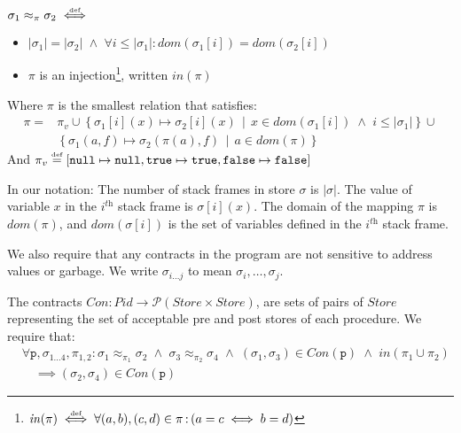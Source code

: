 \documentclass[runningheads,a4paper]{llncs}
\DeclareMathOperator{\band}{\bm{\;\land\;}}
\DeclareMathOperator{\suchthat}{:}
\newcommand*{\qvars}[2]{#1_{#2}}
\newcommand*{\powerset}[1]{\mathcal{P}(#1)}
\newcommand*{\domain}[1]{\mathit{dom}(#1)}
\newcommand*{\cardinality}[1]{\left|{#1}\right|}
\newcommand*{\defeq}{\stackrel{\text{\tiny def}}{=}}
\newcommand*{\defiff}{\stackrel{\text{\tiny def}}{\iff}}
\newcommand*{\setcomp}[2]{\left\{#1\,\middle|\,#2\right\}}
\newcommand*{\Store}{\mathit{Store}}
\newcommand*{\nullv}{\texttt{null}}
\newcommand*{\truev}{\texttt{true}}
\newcommand*{\falsev}{\texttt{false}}
\newcommand*{\Contract}{\mathit{Con}}
\newcommand*\iso{\approx}
\newcommand*{\PName}{\mathit{Pid}}
\newcommand*{\fun}{\texttt{p}}
\newcommand*{\bijection}[1]{\mathit{in}{\left(#1\right)}}
\newcommand*{\store}{\sigma}
\begin{document}
\newcommand*{\piv}{\pi_v}
\begin{definition}[Isomorphism]\label{def:global isomorphism}\setlength{\parindent}{0cm}~

	$\store_1\iso_\pi\store_2 \defiff$
	\begin{itemize}
		\item $\cardinality{\store_1} = \cardinality{\store_2} \band \forall i \le \cardinality{\store_1} \suchthat\domain{\store_1[i]} = \domain{\store_2[i]}$
		\item $\pi$ is an injection\footnote{$\bijection{\pi} \defiff \forall (a,b), (c,d) \in \pi \suchthat \left(a=c \iff b=d\right)$}, written $\bijection{\pi}$
	\end{itemize}

	Where $\pi$ is the smallest relation that satisfies:
		\[\begin{aligned}
		   \pi = &\piv \cup
		   \setcomp{\store_1[i](x)\mapsto\store_2[i](x)}{x \in \domain{\store_1[i]} \band i \le \cardinality{\store_1}} \cup \\
		   &\setcomp{\store_1(a,f)\mapsto\store_2(\pi(a),f)}{a \in \domain{\pi}}
		\end{aligned}\]
	And $\piv \defeq [\nullv\mapsto\nullv, \truev\mapsto\truev, \falsev\mapsto\falsev]$
\end{definition}

In our notation: The number of stack frames in store $\store$ is $\cardinality{\store}$. The value of variable $x$ in the $i^{\textit{th}}$ stack frame is $\store[i](x)$. The domain of the mapping $\pi$ is $\domain{\pi}$, and $\domain{\store[i]}$ is the set of variables defined in the $i^{\textit{th}}$ stack frame.

We also require that any contracts in the program are not sensitive to address values or garbage. We write $\qvars{\store}{i \ldots j}$ to mean $\store_i,\ldots,\store_j$.
\begin{definition}\label{def:contracts}
The contracts $\Contract: \PName \rightarrow \powerset{\Store \times \Store}$, are sets of pairs of $\Store$ representing the set of acceptable pre and post stores of each procedure. We require that:
\[\begin{aligned}
	&	\forall \fun,\qvars{\store}{1 \ldots 4},\qvars{\pi}{1,2} \suchthat
		\store_1 \iso_{\pi_1} \store_2 \band \store_3 \iso_{\pi_2} \store_4 \band (\store_1,\store_3) \in \Contract(\fun) \band \bijection{\pi_1 \cup \pi_2}  \\
	&\quad	\implies
		(\store_2,\store_4) \in \Contract(\fun)
\end{aligned}\]
\end{definition}
\end{document}
